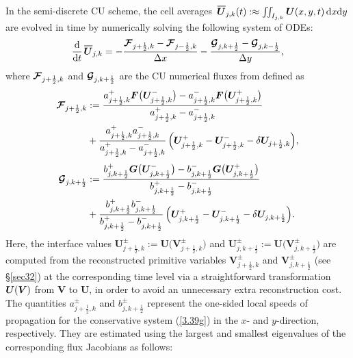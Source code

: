 \documentclass[A4paper,12pt,twoside]{article}
\numberwithin{equation}{section}
\numberwithin{figure}{section}
\numberwithin{table}{section}
\newcommand{\dx}{\Delta x}
\newcommand{\dy}{\Delta y}
\newcommand{\kph}{{k+\frac{1}{2}}}
\newcommand{\kmh}{{k-\frac{1}{2}}}
\newcommand{\jph}{{j+\frac{1}{2}}}
\newcommand{\jmh}{{j-\frac{1}{2}}}
\newcommand{\bV}{\bm{V}}
\newcommand\eref[1]{(\ref{#1})}
\newcommand*\xbar[1]{%
  \hbox{%
    \vbox{%
      \hrule height 0.5pt %
      \kern0.4ex%
      \hbox{%
        \kern-0.05em%
        \ensuremath{#1}%
        \kern-0.00em%
      }%
    }%
  }%
}
\newcommand{\uvec}[2][3]{\boldsymbol{#2\mkern-#1mu}\mkern#1mu}
\newcommand{\bU}{\uvec{U}}
\newcommand{\lore}[1]{{\leavevmode\color{red} #1}}
\begin{document}
In the semi-discrete CU scheme, the cell averages $\,\xbar{\bm U}_{j,k}(t):\approx\iint_{I_{j,k}}\bm U(x,y,t)\,{\rm d}x{\rm d}y$ are evolved
in time by numerically solving the following system of ODEs:
\begin{equation}
\frac{{\rm d}}{{\rm d}t}\,\xbar{\bm U}_{j,k}=-\frac{\bm{{\cal F}}_{\jph,k}-\bm{{\cal F}}_{\jmh,k}}{\dx}-
\frac{\bm{{\cal G}}_{j,\kph}-\bm{{\cal G}}_{j,\kmh}}{\dy},
\label{2.15a}
\end{equation}
where $\bm{{\cal F}}_{\jph,k}$ and $\bm{{\cal G}}_{j,\kph}$ are the CU numerical fluxes from \cite{KLin} defined as
\begin{equation}
\begin{aligned}
\bm{{\cal F}}_{\jph,k}&:=\frac{a^+_{\jph,k}\bm F\big(\bm U^-_{\jph,k}\big)-a^-_{\jph,k}\bm F\big(\bm U^+_{\jph,k}\big)}
{a^+_{\jph,k}-a^-_{\jph,k}}\\
&+\frac{a^+_{\jph,k}a^-_{\jph,k}}{a^+_{\jph,k}-a^-_{\jph,k}}\,\Big(\bm U^+_{\jph,k}-\bm U^-_{\jph,k}-\delta\bm U_{\jph,k}\Big),\\[0.8ex]
\bm{{\cal G}}_{j,\kph}&:=\frac{b^+_{j,\kph}\bm G\big(\bm U^-_{j,\kph}\big)-b^-_{j,\kph}\bm G\big(\bm U^+_{j,\kph}\big)}
{b^+_{j,\kph}-b^-_{j,\kph}}\\
&+\frac{b^+_{j,\kph}b^-_{j,\kph}}{b^+_{j,\kph}-b^-_{j,\kph}}\,\Big(\bm U^+_{j,\kph}-\bm U^-_{j,\kph}-\delta\bm U_{j,\kph}\Big).
\end{aligned}
\label{3.41}
\end{equation}
Here, the interface values $\bm U_{\jph,k}^\pm:=\bm U\big(\bm V_{\jph,k}^\pm\big)$ and
$\bm U_{j,\kph}^\pm:=\bm U\big(\bm V_{j,\kph}^\pm\big)$ are computed from the reconstructed primitive variables $\bm V_{\jph,k}^\pm$ and 
$\bm V_{j,\kph}^\pm$ (see \S\ref{sec32}) at the corresponding time level via a straightforward transformation $\bU(\bV)$ from $\bm V$ to
$\bm U$, \lore{in order to avoid an unnecessary extra reconstruction cost}. %
\lore{The quantities} $a_{\jph,k}^\pm$ and $b_{j,\kph}^\pm$ \lore{represent} %
the one-sided local speeds of propagation for the conservative system
\eref{3.39g} in the $x$- and $y$-direction, respectively. They are estimated using the largest and 
smallest eigenvalues of the corresponding flux Jacobians as follows:
\end{document}
